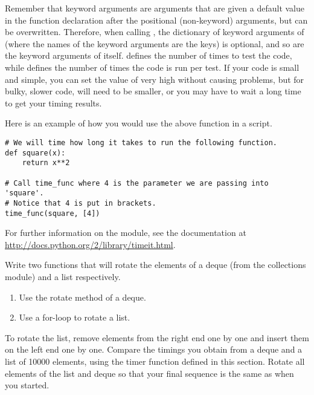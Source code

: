 Remember that keyword arguments are arguments that are given a default value in the function declaration after the positional (non-keyword) arguments, but can be overwritten. Therefore, when calling , the dictionary of keyword arguments of  (where the names of the keyword arguments are the keys) is optional, and so are the keyword arguments of  itself.
 defines the number of times to test the code, while  defines the number of times the code is run per test. If your code is small and simple, you can set the value of  very high without causing problems, but for bulky, slower code,  will need to be smaller, or you may have to wait a long time to get your timing results.

Here is an example of how you would use the above function in a script.

\begin{lstlisting}
# We will time how long it takes to run the following function.
def square(x):
    return x**2

# Call time_func where 4 is the parameter we are passing into 'square'.
# Notice that 4 is put in brackets.
time_func(square, [4])
\end{lstlisting}

For further information on the  module, see the documentation at \url{http://docs.python.org/2/library/timeit.html}.


\begin{problem}
Write two functions that will rotate the elements of a deque (from the collections module) and a list respectively.
\begin{enumerate}
\item Use the rotate method of a deque.
\item Use a for-loop to rotate a list.
\end{enumerate}

To rotate the list, remove elements from the right end one by one and insert them on the left end one by one.
Compare the timings you obtain from a deque and a list of 10000 elements, using the timer function defined in this section. Rotate all elements of the list and deque so that your final sequence is the same as when you started.
\end{problem}





